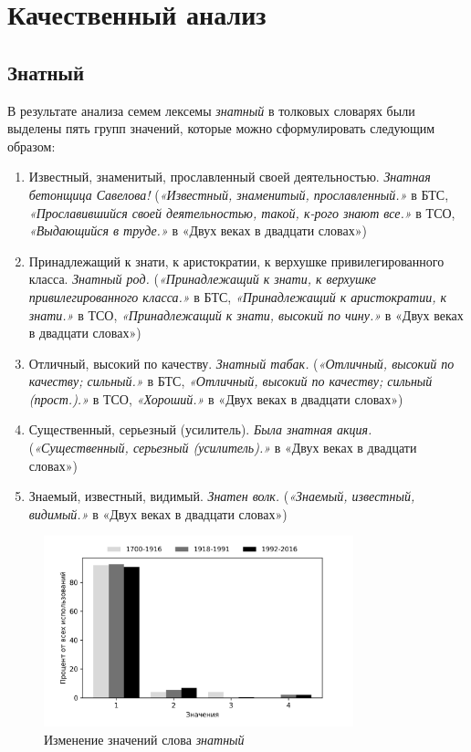 \chapter{Качественный анализ}

\section*{Знатный}

В результате анализа семем лексемы \textit{знатный} в толковых словарях были выделены пять групп значений,
которые можно сформулировать следующим образом:

\begin{enumerate}
    \item Известный, знаменитый, прославленный своей деятельностью. \textit{Знатная бетонщица Савелова!}
    (\textit{«Известный, знаменитый, прославленный.»} в БТС,
    \textit{«Прославившийся своей деятельностью, такой, к-рого знают все.»} в ТСО,
    \textit{«Выдающийся в труде.»} в «Двух веках в двадцати словах»)

    \item Принадлежащий к знати, к аристократии, к верхушке привилегированного класса. \textit{Знатный род.}
    (\textit{«Принадлежащий к знати, к верхушке привилегированного класса.»} в БТС,
    \textit{«Принадлежащий к аристократии, к знати.»} в ТСО,
    \textit{«Принадлежащий к знати, высокий по чину.»} в «Двух веках в двадцати словах»)

    \item Отличный, высокий по качеству. \textit{Знатный табак.}
    (\textit{«Отличный, высокий по качеству; сильный.»} в БТС,
    \textit{«Отличный, высокий по качеству; сильный (прост.).»} в ТСО,
    \textit{«Хороший.»} в «Двух веках в двадцати словах»)

    \item Существенный, серьезный (усилитель). \textit{Была знатная акция.}
    (\textit{«Существенный, серьезный (усилитель).»} в «Двух веках в двадцати словах»)

    \item Знаемый, известный, видимый. \textit{Знатен волк.}
    (\textit{«Знаемый, известный, видимый.»} в «Двух веках в двадцати словах»)
\end{enumerate}

\begin{figure}[H]
	\centering
	\includegraphics[width=0.8\textwidth]{img/visualizations/znatnyj_minimal}
	\caption{Изменение значений слова \textit{знатный}}
	\label{fig:Знатный}
\end{figure}

